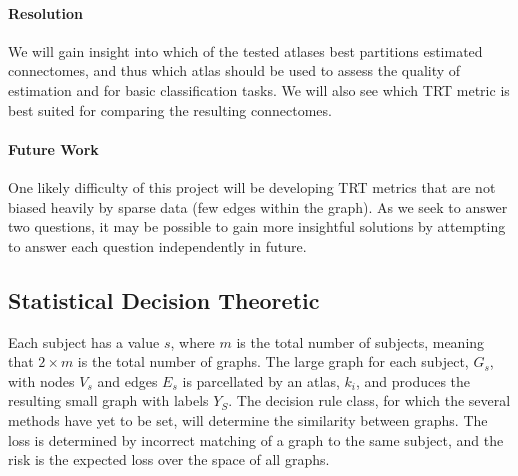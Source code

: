 \documentclass[12pt]{article}
\begin{document}
\paragraph{Resolution}
We will gain insight into which of the tested atlases best partitions estimated connectomes, and thus which atlas should be used to assess the quality of estimation and for basic classification tasks. We will also see which TRT metric is best suited for comparing the resulting connectomes.
\paragraph{Future Work}
One likely difficulty of this project will be developing TRT metrics that are not biased heavily by sparse data (few edges within the graph). As we seek to answer two questions, it may be possible to gain more insightful solutions by attempting to answer each question independently in future.

\pagebreak
\subsection*{Statistical Decision Theoretic}
Each subject has a value $s$, where $m$ is the total number of subjects, meaning that $2 \times m$ is the total number of graphs. The large graph for each subject, $G_s$, with nodes $V_s$ and edges $E_s$ is parcellated by an atlas, $k_i$, and produces the resulting small graph with labels $Y_S$. The decision rule class, for which the several methods have yet to be set, will determine the similarity between graphs. The loss is determined by incorrect matching of a graph to the same subject, and the risk is the expected loss over the space of all graphs.
\end{document}
